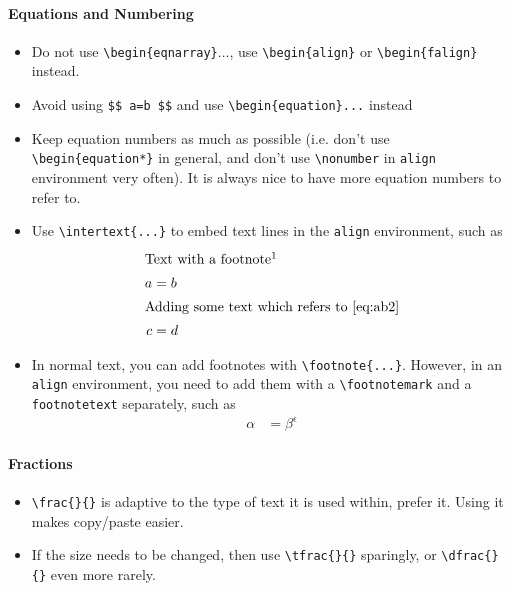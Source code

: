 \documentclass[12pt,etk-draft]{etk-article}
\begin{document}
\paragraph{Equations and Numbering}
\begin{itemize}
\item Do not use \verb!\begin{eqnarray}!..., use \verb!\begin{align}! or \verb!\begin{falign}! instead.
\item Avoid using \verb!$$ a=b $$! and use \verb!\begin{equation}...! instead
\item Keep equation numbers as much as possible (i.e. don't use \verb!\begin{equation*}! in general, and don't use \verb!\nonumber! in \verb!align! environment very often).  It is always nice to have more equation numbers to refer to.
\item Use \verb!\intertext{...}! to embed text lines in the \verb!align! environment, such as
\begin{align}
\intertext{Text with a footnote\footnotemark}
a &= b\label{eq:ab2}\\
\intertext{Adding some text which refers to \cref{eq:ab2}}
c &= d
\end{align}
\item In normal text, you can add footnotes with \verb!\footnote{...}!.  However, in an \verb!align! environment, you need to add them with a \verb!\footnotemark! and a \verb!footnotetext! separately, such as 
\begin{align}
\alpha &= \beta^{\epsilon}
\end{align}

\end{itemize}
\paragraph{Fractions}
\begin{itemize}
\item \verb!\frac{}{}! is adaptive to the type of text it is used within, prefer it.  Using it makes copy/paste easier.
\item If the size needs to be changed, then use \verb!\tfrac{}{}! sparingly, or \verb!\dfrac{}{}! even more rarely.
\end{itemize}
\end{document}
